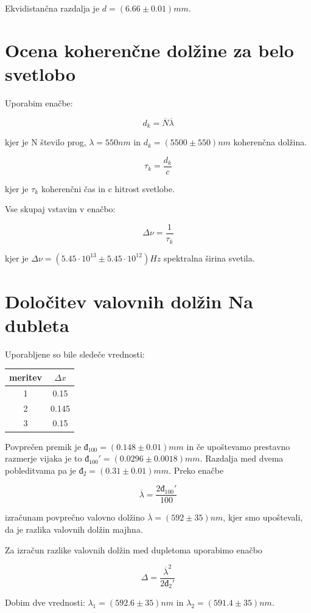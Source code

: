 \documentclass[12pt]{report}
\begin{document}
Ekvidistančna razdalja je $d=(6.66 \pm 0.01)mm$. 

\section*{Ocena koherenčne dolžine za belo svetlobo}

Uporabim enačbe: 

\begin{equation}
  d_k = \overline{N}\overline{\lambda}
\end{equation}

kjer je N število prog, $\lambda = 550nm$ in $d_k = (5500 \pm 550)nm$ koherenčna dolžina. 

\begin{equation}
  \tau_k = \frac{d_k}{c}
\end{equation}

 kjer je $\tau_k$ koherenčni čas in c hitrost svetlobe. 

 Vse skupaj vstavim v enačbo:

 \begin{equation}
  \Delta \nu = \frac{1}{\tau_k}
 \end{equation}

 kjer je $\Delta \nu = (5.45 \cdot 10^{13}\pm 5.45\cdot 10^{12})Hz$ spektralna širina svetila. 

 \section*{Določitev valovnih dolžin Na dubleta}

 Uporabljene so bile sledeče vrednosti: 

 \begin{tabela}
  \centering
  \begin{tabular}{|c|c|}\hline
    meritev & $\Delta x$ \\ \hline
    1 & 0.15 \\ \hline
    2 & 0.145 \\ \hline
    3 & 0.15 \\ \hline
  \end{tabular}
\end{tabela}

Povprečen premik je $đ_{100} = (0.148\pm0.01)mm$ in če upoštevamo prestavno razmerje vijaka je to $đ_{100} ' = (0.0296\pm0.0018)mm$. Razdalja med dvema pobleditvama pa je $đ_2 = (0.31\pm0.01)mm$. 
Preko enačbe

\begin{equation}
  \overline{\lambda}= \frac{2đ_{100}'}{100}
\end{equation}

izračunam povprečno valovno dolžino $\overline{\lambda} = (592 \pm 35)nm$, kjer smo upoštevali, da je razlika valovnih dolžin majhna. 

Za izračun razlike valovnih dolžin med dupletoma uporabimo enačbo

\begin{equation}
  \Delta = \frac{\overline{\lambda}^2}{2đ_2'}
\end{equation}

Dobim dve vrednosti: $\lambda_1 = (592.6\pm35)nm$ in $\lambda_2 = (591.4 \pm 35)nm$. 
\end{document}
